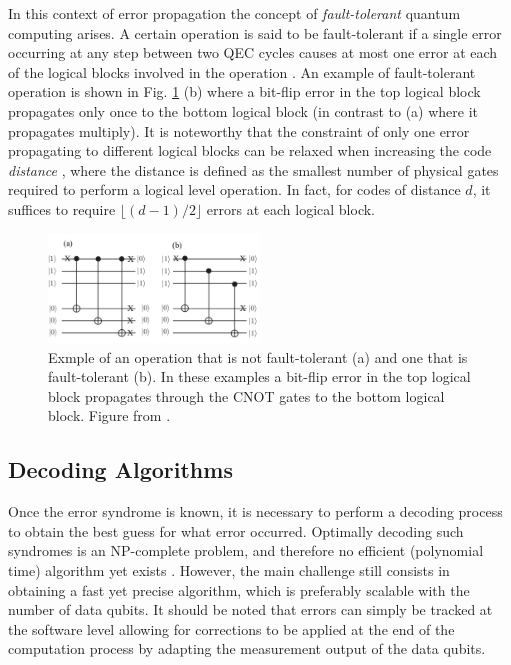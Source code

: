 In this context of error propagation the concept of \textit{fault-tolerant}
quantum computing arises. A certain operation is said to be fault-tolerant if a
single error occurring at any step between two QEC cycles causes at most one
error at each of the logical blocks involved in the operation
\cite{Devitt_2013}. An example of fault-tolerant operation is shown in Fig.
\ref{fig:fault_tol} (b) where a bit-flip error in the top logical block
propagates only once to the bottom logical block (in contrast to (a) where it
propagates multiply). It is noteworthy that the constraint of only one error
propagating to different logical blocks can be relaxed when increasing the code
\textit{distance} \cite{Devitt_2013}, where the distance is defined as the
smallest number of physical gates required to perform a logical level operation.
In fact, for codes of distance $d$, it suffices to require $\lfloor{(d-1)/2}
\rfloor$ errors at each logical block.

\begin{figure}[htbp]
  \centering
  \includegraphics[width=0.5\textwidth]{images/fault_tolerance.pdf}
  \caption{Exmple of an operation that is not fault-tolerant (a) and one that is
    fault-tolerant (b). In these examples a bit-flip error in the top logical
    block propagates through the CNOT gates to the bottom logical block. Figure
    from \cite{Devitt_2013}.}
  \label{fig:fault_tol}
\end{figure}

\subsection{Decoding Algorithms}
Once the error syndrome is known, it is necessary to perform a decoding process
to obtain the best guess for what error occurred. Optimally decoding such
syndromes is an NP-complete problem, and therefore no efficient (polynomial
time) algorithm yet exists \cite{Berlekamp}. However, the main challenge still
consists in obtaining a fast yet precise algorithm, which is preferably scalable
with the number of data qubits. It should be noted that errors can simply be
tracked at the software level allowing for corrections to be applied at the end
of the computation process by adapting the measurement output of the data
qubits.

